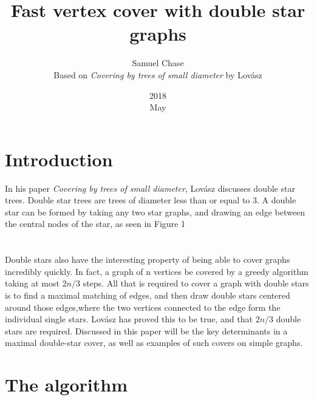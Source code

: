 \documentclass{article}
\title{Fast vertex cover with double star graphs}
\date{2018\\ May}
\author{Samuel Chase\\ Based on \textit{Covering by trees of small diameter} by Lov\'asz}
\begin{document}
	\maketitle
	\section{Introduction}
	In his paper \textit{Covering by trees of small diameter}, Lov\'asz discusses double star trees. Double star trees are trees of diameter less than or equal to 3. A double star can be formed by taking any two star graphs, and drawing an edge between the central nodes of the star, as seen in Figure 1
	\\\\\\
	Double stars also have the interesting property of being able to cover graphs incredibly quickly. In fact, a graph of n vertices be covered by a greedy algorithm taking at most $2n/3$ steps. All that is required to cover a graph with double stars is to find a maximal matching of edges, and then draw double stars centered around those edges,where the two vertices connected to the edge form the individual single stars. Lov\'asz has proved this to be true, and that $2n/3$ double stars are required. Discussed in this paper will be the key determinants in a maximal double-star cover, as well as examples of such covers on simple graphs.
	\section{The algorithm}
\end{document}
